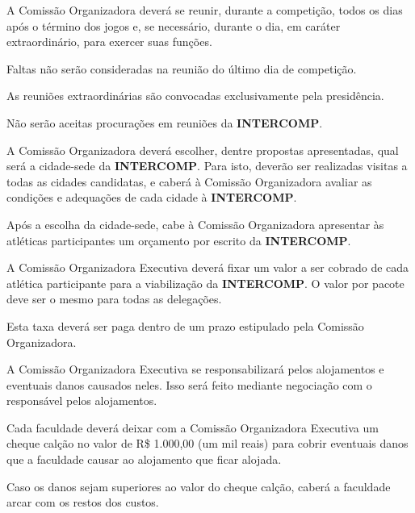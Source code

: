 \begin{article}
	A Comissão Organizadora deverá se reunir, durante a competição, todos os dias após o término dos jogos e, se necessário, durante o dia, em caráter extraordinário, para exercer suas funções.

	\begin{xparagraph}
		Faltas não serão consideradas na reunião do último dia de competição.
	\end{xparagraph}

	\begin{xparagraph}
		As reuniões extraordinárias são convocadas exclusivamente pela presidência.
	\end{xparagraph}
\end{article}

\begin{article}
	Não serão aceitas procurações em reuniões da \textbf{INTERCOMP}.
\end{article}

\begin{article}
	A Comissão Organizadora deverá escolher, dentre propostas apresentadas, qual será a cidade-sede da \textbf{INTERCOMP}. Para isto, deverão ser realizadas visitas a todas as cidades candidatas, e caberá à Comissão Organizadora avaliar as condições e adequações de cada cidade à \textbf{INTERCOMP}.

	\begin{xparagraph}
		Após a escolha da cidade-sede, cabe à Comissão Organizadora apresentar às atléticas participantes um orçamento por escrito da \textbf{INTERCOMP}.
	\end{xparagraph}

	\begin{xparagraph}
		A Comissão Organizadora Executiva deverá fixar um valor a ser cobrado de cada atlética participante para a viabilização da \textbf{INTERCOMP}. O valor por pacote deve ser o mesmo para todas as delegações.
	\end{xparagraph}

	\begin{xparagraph}
		Esta taxa deverá ser paga dentro de um prazo estipulado pela Comissão Organizadora.
	\end{xparagraph}

	\begin{xparagraph}
		A Comissão Organizadora Executiva se responsabilizará pelos alojamentos e eventuais danos causados neles. Isso será feito mediante negociação com o responsável pelos alojamentos.
	\end{xparagraph}

	\begin{xparagraph}
		Cada faculdade deverá deixar com a Comissão Organizadora Executiva um cheque calção no valor de R\$ 1.000,00 (um mil reais) para cobrir eventuais danos que a faculdade causar ao alojamento que ficar alojada.
	\end{xparagraph}

	\begin{xparagraph}
		Caso os danos sejam superiores ao valor do cheque calção, caberá a faculdade arcar com os restos dos custos.
	\end{xparagraph}
\end{article}

